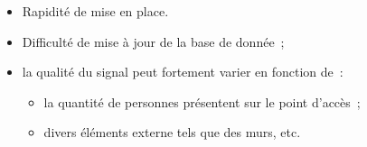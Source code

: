 \documentclass[11pt,a4paper]{article}
\begin{document}
    \begin{tcolorbox}[title=Avantages :]
      \begin{itemize}
        \item Rapidité de mise en place.
      \end{itemize}
    \end{tcolorbox}
    \begin{tcolorbox}[title=Désavantages :]
      \begin{itemize}
        \item Difficulté de mise à jour de la base de donnée~;
        \item la qualité du signal peut fortement varier en fonction de~:
          \begin{itemize}
            \item la quantité de personnes présentent sur le point d'accès~;
            \item divers éléments externe tels que des murs, etc.
	      \end{itemize}
      \end{itemize}
    \end{tcolorbox}
\end{document}
